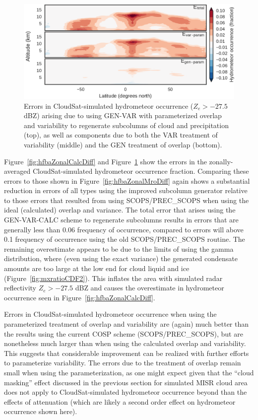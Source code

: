 \begin{figure}[htbp]
\centering
\includegraphics{graphics/subgrid2_hfba_zonal_gen-var-param_diff.pdf}
\caption{\label{fig:hfbaZonalParamDiff}Errors in CloudSat-simulated
hydrometeor occurrence (\(Z_e > -27.5\) dBZ) arising due to using
GEN-VAR with parameterized overlap and variability to regenerate
subcolumns of cloud and precipitation (top), as well as components due
to both the VAR treatment of variability (middle) and the GEN treatment
of overlap (bottom).}\label{fig:hfbaZonalParamDiff}
\end{figure}

Figure~\ref{fig:hfbaZonalCalcDiff} and
Figure~\ref{fig:hfbaZonalParamDiff} show the errors in the
zonally-averaged CloudSat-simulated hydrometeor occurrence fraction.
Comparing these errors to those shown in
Figure~\ref{fig:hfbaZonalMroDiff} again shows a substantial reduction in
errors of all types using the improved subcolumn generator relative to
those errors that resulted from using SCOPS/PREC\_SCOPS when using the
ideal (calculated) overlap and variance. The total error that arises
using the GEN-VAR-CALC scheme to regenerate subcolumns results in errors
that are generally less than 0.06 frequency of occurrence, compared to
errors will above 0.1 frequency of occurrence using the old
SCOPS/PREC\_SCOPS routine. The remaining overestimate appears to be due
to the limits of using the gamma distribution, where (even using the
exact variance) the generated condensate amounts are too large at the
low end for cloud liquid and ice (Figure~\ref{fig:mxratioCDF2}). This
inflates the area with simulated radar reflectivity \(Z_e > -27.5\) dBZ
and causes the overestimate in hydrometeor occurrence seen in
Figure~\ref{fig:hfbaZonalCalcDiff}.

Errors in CloudSat-simulated hydrometeor occurrence when using the
parameterized treatment of overlap and variability are (again) much
better than the results using the current COSP scheme
(SCOPS/PREC\_SCOPS), but are nonetheless much larger than when using the
calculated overlap and variability. This suggests that considerable
improvement can be realized with further efforts to parameterize
variability. The errors due to the treatment of overlap remain small
when using the parameterization, as one might expect given that the
``cloud masking'' effect discussed in the previous section for simulated
MISR cloud area does not apply to CloudSat-simulated hydrometeor
occurrence beyond than the effects of attenuation (which are likely a
second order effect on hydrometeor occurrence shown here).

